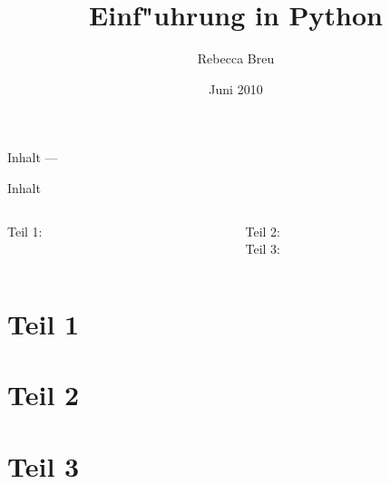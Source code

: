 \documentclass{beamer}
\title{Einf"uhrung in Python}
\date{Juni 2010}
\author{Rebecca Breu}
\institute
{
 Verteilte Systeme und Grid-Computing \\
 JSC\\
 Forschungszentrum J"ulich
}
\begin{document}
\AtBeginPart
{
  \begin{frame}
  \titlepage
  \end{frame}

  \begin{frame}{Inhalt --- \insertpart}
  \tableofcontents
  \end{frame}
}


\AtBeginSection[]
{
   \begin{frame}{\insertsection}
       \tableofcontents[currentsection]
   \end{frame}
}


\begin{frame}
\titlepage
\end{frame}

\begin{frame}{Inhalt}
\begin{columns}[t]

\begin{column}{0.4\textwidth}
  Teil 1:\\[3mm]
  \tableofcontents[part=1]
\end{column}

\begin{column}{0.6\textwidth}
  Teil 2:\\[3mm]
  \tableofcontents[part=2]
  \vspace{7mm}
  Teil 3:\\[3mm]
  \tableofcontents[part=3]
\end{column}

\end{columns}
\end{frame}


\part{Teil 1}









\vielspass

\part{Teil 2}





\vielspass

\part{Teil 3}





\vielspass
\end{document}
